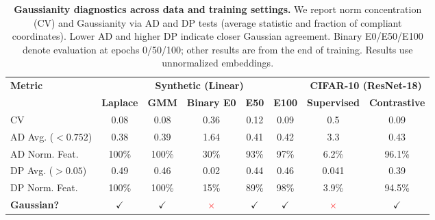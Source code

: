 \documentclass{article}
\begin{document}
\begin{table}[b]
\centering
\caption{\textbf{Gaussianity diagnostics across data and training settings.}
We report norm concentration (CV) and Gaussianity via AD and DP tests (average statistic and fraction of compliant coordinates).
Lower AD and higher DP indicate closer Gaussian agreement.
Binary E0/E50/E100 denote evaluation at epochs 0/50/100; other results are from the end of training.
Results use unnormalized embeddings.}
\label{table:gaussian_core}

\setlength{\tabcolsep}{4pt}
\renewcommand{\arraystretch}{1.1}

\begin{adjustbox}{width=\linewidth}
\begin{tabular}{|l||cc|ccc||cc|}
\hline
\multirow{2}{*}{\textbf{Metric}}
& \multicolumn{5}{c||}{\textbf{Synthetic (Linear)}} 
& \multicolumn{2}{c|}{\textbf{CIFAR-10 (ResNet-18)}} \\
\cline{2-8}

& \textbf{Laplace} & \textbf{GMM}
& \textbf{Binary E0} & \textbf{E50} & \textbf{E100}
& \textbf{Supervised} & \textbf{Contrastive} \\
\hline\hline

CV 
& 0.08 & 0.08 
& 0.36 & 0.12 & 0.09
& 0.5 & 0.09 \\

AD Avg. ($<0.752$) 
& 0.38 & 0.39 
& 1.64 & 0.41 & 0.42
& 3.3 & 0.43 \\

AD Norm. Feat. 
& 100\% & 100\% 
& 30\% & 93\% & 97\%
& 6.2\% & 96.1\% \\

DP Avg. ($>0.05$) 
& 0.49 & 0.46 
& 0.02 & 0.44 & 0.46
& 0.041 & 0.39 \\

DP Norm. Feat. 
& 100\% & 100\% 
& 15\% & 89\% & 98\%
& 3.9\% & 94.5\% \\

\hline

\textbf{Gaussian?} 
& \textcolor{green!60!black}{$\checkmark$} 
& \textcolor{green!60!black}{$\checkmark$}
& \textcolor{red}{$\times$} 
& \textcolor{green!60!black}{$\checkmark$} 
& \textcolor{green!60!black}{$\checkmark$}
& \textcolor{red}{$\times$} 
& \textcolor{green!60!black}{$\checkmark$} \\

\hline
\end{tabular}
\end{adjustbox}
\end{table}
\end{document}
